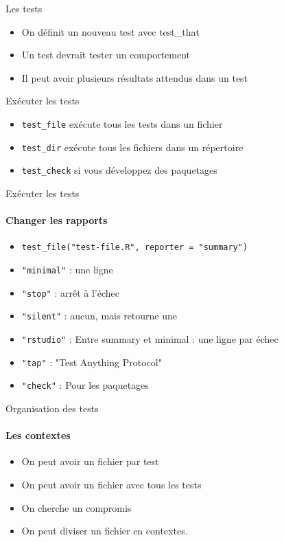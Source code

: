 \documentclass[11pt]{beamer}
\begin{document}
\begin{frame}{Les tests}
\begin{itemize}
\item On définit un nouveau test avec test\_that
\item Un test devrait tester un comportement
\item Il peut avoir plusieurs résultats attendus dans un test
\end{itemize}
\end{frame}

\begin{frame}{Exécuter les tests}
\begin{itemize}
\item {\texttt{test\_file}} exécute tous les tests dans un fichier
\item {\texttt{test\_dir}} exécute tous les fichiers dans un répertoire
\item \texttt{test\_check} si vous développez des paquetages
\end{itemize}
\end{frame}

\begin{frame}{Exécuter les tests}
\framesubtitle{Changer les rapports}
\begin{itemize}
\item \texttt{test\_file("test-file.R", reporter = "summary")}
\item \texttt{"minimal"} : une ligne
\item \texttt{"stop"} : arrêt à l'échec
\item \texttt{"silent"} : aucun, mais retourne une
\item \texttt{"rstudio"} : Entre summary et minimal : une ligne par échec
\item \texttt{"tap"} : "Test Anything Protocol"
\item \texttt{"check"} : Pour les paquetages
\end{itemize}
\end{frame}

\begin{frame}{Organisation des tests}
\framesubtitle{Les contextes}
\begin{itemize}
\item On peut avoir un fichier par test
\item On peut avoir un fichier avec tous les tests
\item On cherche un compromis
\item On peut diviser un fichier en contextes.
\end{itemize}
\end{frame}
\end{document}
